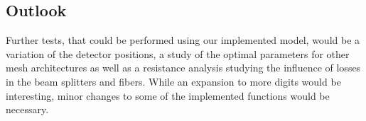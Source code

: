 
\subsection{Outlook}
Further tests, that could be performed using our implemented model, would be a variation of the detector positions, a study of the optimal parameters for other mesh architectures as well as a resistance analysis studying the influence of losses in the beam splitters and fibers.
While an expansion to more digits would be interesting, minor changes to some of the implemented functions would be necessary.



